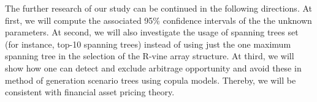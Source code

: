\documentclass{llncs}
\begin{document}
The further research of our study can be continued
in the following directions. 
At first, we will compute the associated 95\% confidence intervals of the the unknown parameters. %
At second, we will also investigate the usage of spanning trees set (for instance, top-10 spanning trees) instead of using just the one maximum spanning tree in the selection of the R-vine array structure.
At third, we will show how one can detect and exclude arbitrage opportunity and avoid these in method of generation scenario trees using copula models. Thereby, we will be consistent with financial asset pricing theory.



%

%

\end{document}
